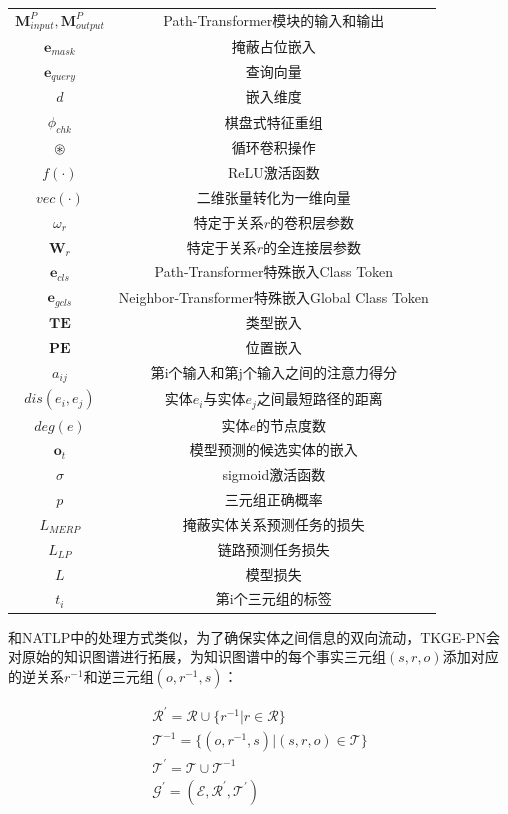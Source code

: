 \begin{longtable}[htbp]{cc}
  $\mathbf{M}_{input}^{P},\mathbf{M}_{output}^{P}$ & Path-Transformer模块的输入和输出\\
  $\boldsymbol{e}_{mask}$ & 掩蔽占位嵌入\\
  $\boldsymbol{e}_{query}$ & 查询向量\\
  $d$ & 嵌入维度\\
  $\phi_{chk}$ & 棋盘式特征重组\\
  $\circledast$ & 循环卷积操作\\
  $f(\cdot )$ & ReLU激活函数\\
  $vec(\cdot)$ & 二维张量转化为一维向量\\
  $\omega_r$ & 特定于关系$r$的卷积层参数\\
  $\mathbf{W}_r$ &特定于关系$r$的全连接层参数\\
  $\boldsymbol{e}_{cls}$ & Path-Transformer特殊嵌入Class Token\\
  $\boldsymbol{e}_{gcls}$ & Neighbor-Transformer特殊嵌入Global Class Token\\
  $\mathbf{TE}$ & 类型嵌入\\
  $\mathbf{PE}$ & 位置嵌入\\
  $a_{ij}$ & 第i个输入和第j个输入之间的注意力得分\\
  $dis(e_i,e_j)$ & 实体$e_i$与实体$e_j$之间最短路径的距离\\
  $deg(e)$ & 实体$e$的节点度数\\
  $\boldsymbol{o}_t$ & 模型预测的候选实体的嵌入\\
  $\sigma $ & sigmoid激活函数\\
  $p$ & 三元组正确概率\\
  $L_{MERP}$ & 掩蔽实体关系预测任务的损失\\
  $L_{LP}$ & 链路预测任务损失\\
  $L$ & 模型损失\\
  $t_i$ & 第i个三元组的标签\\

\end{longtable}

和NATLP中的处理方式类似，为了确保实体之间信息的双向流动，TKGE-PN会对原始的知识图谱进行拓展，为知识图谱中的每个事实三元组$(s,r,o)$添加对应的逆关系$r^{-1}$和逆三元组$(o,r^{-1},s)$：

\begin{gather}
    \mathcal{R}^{\prime}=\mathcal{R}\cup\{ r^{-1} | r\in \mathcal{R}\}\\
    \mathcal{T}^{-1}= \{ (o,r^{-1},s)| (s,r,o)\in \mathcal{T}\}\\
    \mathcal{T}^{\prime} = \mathcal{T}\cup\mathcal{T}^{-1}\\
    \mathcal{G}^\prime = (\mathcal{E}, \mathcal{R}^\prime, \mathcal{T}^\prime)
\end{gather}

